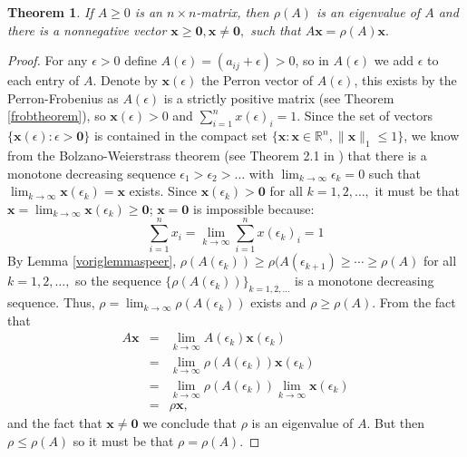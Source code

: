 \documentclass[a4paper,11pt]{report}
\newtheorem{theorem}{Theorem}[section]
\newcommand{\R}{{\mathbb R}}
\begin{document}
\begin{theorem}\label{perronzonderperron}
  If $A \geq 0$ is an $n \times n$-matrix, then $\rho(A)$ is an eigenvalue of $A$ 
  and there is a nonnegative vector $\mathbf{x} \geq \mathbf{0}, \mathbf{x} \not = \mathbf{0},$ 
  such that $A\mathbf{x}=\rho(A)\mathbf{x}.$
\end{theorem}
\begin{proof}
  For any $\epsilon > 0$ define $A(\epsilon)=(a_{ij}+\epsilon) > 0$, so in $A(\epsilon)$ we add $\epsilon$ to each entry of $A$. Denote by $\mathbf{x}(\epsilon)$ 
  the Perron vector of $A(\epsilon)$, this exists by the Perron-Frobenius as $A(\epsilon)$ is a strictly positive matrix (see Theorem \ref{frobtheorem}), so $\mathbf{x}(\epsilon) > 0$ and 
  $\sum^n_{i = 1} x(\epsilon)_i = 1$. Since the set of vectors $\{\mathbf{x}(\epsilon): \epsilon > \mathbf{0}\}$ 
  is contained in the compact set $\{\mathbf{x}: \mathbf{x}\in \R^n, \|\mathbf{x}\|_1 \leq 1\}$, 
  we know from the Bolzano-Weierstrass theorem (see Theorem 2.1 in \cite{colebunders}) that there is a monotone decreasing sequence $\epsilon_1 > \epsilon_2 > \ldots$ with $\lim_{k\to\infty}\epsilon_k = 0$
  such that $\lim_{k \to \infty}\mathbf{x}(\epsilon_k) = \mathbf{x}$ exists. 
  Since $\mathbf{x}(\epsilon_k) >  \mathbf{0}$ for all $k=1,2,\ldots,$ it must be that $\mathbf{x} = \lim_{k \to \infty} \mathbf{x}(\epsilon_k) \geq 
   \mathbf{0}$; $\mathbf{x} =  \mathbf{0}$ is impossible because:
  $$\sum^n_{i = 1}x_i = \lim_{k\to 
  \infty}\sum^n_{i=1}x(\epsilon_k)_i = 1$$
  By Lemma \ref{voriglemmaspeer}, $\rho(A(\epsilon_k)) \geq \rho(A(\epsilon_{k+1}) \geq \cdots \geq \rho(A)$ 
  for all $k = 1, 2, \ldots, $ so the sequence $\{\rho(A(\epsilon_k))\}_{k=1,2,\ldots}$ 
  is a monotone decreasing sequence. Thus, $\rho = \lim_{k \to \infty} \rho(A(\epsilon_k))$ 
  exists and $\rho \geq \rho(A).$ From the fact that
  \begin{eqnarray*}
    A\mathbf{x} &=& \lim_{k\to\infty} A(\epsilon_k)\mathbf{x}(\epsilon_k)\\
    &=& \lim_{k\to\infty} \rho(A(\epsilon_k))\mathbf{x}(\epsilon_k)\\
    &=& \lim_{k\to \infty} \rho(A(\epsilon_k)) \lim_{k\to \infty} \mathbf{x}(\epsilon_k) \\
    &=& \rho \mathbf{x},
  \end{eqnarray*}
  and the fact that $\mathbf{x}\not =  \mathbf{0}$ we conclude that $\rho$ is an 
  eigenvalue of $A$. But then $\rho \leq \rho(A)$ so it must be that $\rho = 
  \rho(A)$.
\end{proof}
\end{document}

